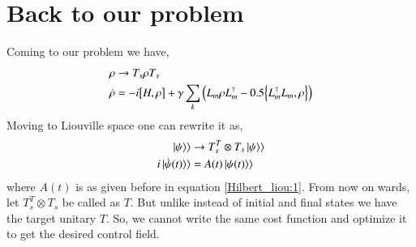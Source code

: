 \section{Back to our problem}
Coming to our problem we have,
\begin{align}\label{Hilbert:2}
    \rho &\rightarrow T_{s}\rho T_{s}\\
    \dot{\rho} &= - i\comm{H}{\rho} + \gamma
    \sum_{k} \left(L_{m} \rho L_{m}^{\dagger} - 0.5\anticommutator{L_{m}^{\dagger}L_{m}}{ \rho}\right)
\end{align}
Moving to Liouville space one can rewrite it as, 
 \begin{align}\label{Liouville:2}
     \ket{\psi}\rangle &\rightarrow T_{s}^{T} \otimes T_{s}\ket{\psi}\rangle\\
     i\ket{\dot{\psi}(t)}\rangle &= A(t)\ket{\psi(t)}\rangle
 \end{align}
where $A(t)$ is as given before in equation \eqref{Hilbert_liou:1}. From now on wards, let $T_{s}^{T} \otimes T_{s}$ be called as $T$.  But unlike \cite{2018EPJST.227..203S} instead of initial and final states we have the target unitary $T$. So, we cannot write the  same cost function and optimize it to get the desired control field. 
